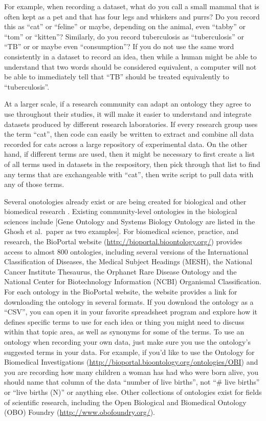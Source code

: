 \documentclass[]{tufte-book}
\begin{document}
For example, when recording a dataset, what do you call a small mammal that is
often kept as a pet and that has four legs and whiskers and purrs? Do you record
this as ``cat'' or ``feline'' or maybe, depending on the animal, even ``tabby'' or
``tom'' or ``kitten''? Similarly, do you record tuberculosis as ``tuberculosis'' or
``TB'' or or maybe even ``consumption''? If you do not use the same word
consistently in a dataset to record an idea, then while a human might be able to
understand that two words should be considered equivalent, a computer will not
be able to immediately tell that ``TB'' should be treated equivalently to
``tuberculosis''.

At a larger scale, if a research community can adapt an ontology they agree to
use throughout their studies, it will make it easier to understand and integrate
datasets produced by different research laboratories. If every research group
uses the term ``cat'', then code can easily be written to extract and combine
all data recorded for cats across a large repository of experimental data.
On the other hand, if different terms are used, then it might be necessary to
first create a list of all terms used in datasets in the respository, then pick
through that list to find any terms that are exchangeable with ``cat'', then write
script to pull data with any of those terms.

Several onotologies already exist or are being created for biological and other
biomedical research \citep{ghosh2011software}. Existing community-level ontologies in
the biological sciences include {[}Gene Ontology and Systems Biology Ontology are
listed in the Ghosh et al.~paper as two examples{]}. For biomedical science,
practice, and research, the BioPortal website
(\url{http://bioportal.bioontology.org/}) provides access to almost 800 ontologies,
including several versions of the International Classification of Diseases, the
Medical Subject Headings (MESH), the National Cancer Institute Thesaurus, the
Orphanet Rare Disease Ontology and the National Center for Biotechnology
Information (NCBI) Organismal Classification. For each ontology in the BioPortal
website, the website provides a link for downloading the ontology in several
formats. If you download the ontology as a ``CSV'', you can open it in your
favorite spreadsheet program and explore how it defines specific terms to use
for each idea or thing you might need to discuss within that topic area, as well
as synonyms for some of the terms. To use an ontology when recording your own
data, just make sure you use the ontology's suggested terms in your data. For
example, if you'd like to use the Ontology for Biomedical Investigations
(\url{http://bioportal.bioontology.org/ontologies/OBI}) and you are recording how many
children a woman has had who were born alive, you should name that column of the
data ``number of live births'', not ``\# live births'' or ``live births (N)'' or
anything else. Other collections of ontologies exist for fields of scientific
research, including the Open Biological and Biomedical Ontology (OBO) Foundry
(\url{http://www.obofoundry.org/}).
\end{document}
